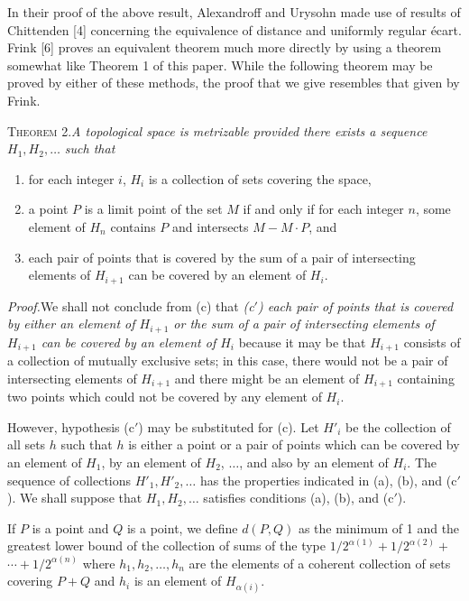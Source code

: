 \documentclass[11pt,a4paper,leqno,twoside]{article}
\newcommand{\thm}[2]{\par\medskip\noindent\textsc{Theorem #1.}\enspace\textit{#2}\par}
\newcommand{\proof}{\par\noindent\textit{Proof.}\enspace}
\begin{document}
In their proof of the above result, Alexandroff and Urysohn made use of results of Chittenden [4] concerning the equivalence of distance and uniformly regular \'ecart. Frink [6] proves an equivalent theorem much more directly by using a theorem somewhat like Theorem 1 of this paper. While the following theorem may be proved by either of these methods, the proof that we give resembles that given by Frink.

\thm{2}{A topological space is metrizable provided there exists a sequence $H_1,H_2,\ldots$ such that}
\begin{enumerate}[label=(\alph*),nosep,leftmargin=2.5em]\itshape
\item for each integer $i$, $H_i$ is a collection of sets covering the space,
\item a point $P$ is a limit point of the set $M$ if and only if for each integer $n$, some element of $H_n$ contains $P$ and intersects $M-M\cdot P$, and
\item each pair of points that is covered by the sum of a pair of intersecting elements of $H_{i+1}$ can be covered by an element of $H_i$.
\end{enumerate}
\proof We shall not conclude from (c) that \textit{(c$'$) each pair of points that is covered by either an element of $H_{i+1}$ or the sum of a pair of intersecting elements of $H_{i+1}$ can be covered by an element of $H_i$} because it may be that $H_{i+1}$ consists of a collection of mutually exclusive sets; in this case, there would not be a pair of intersecting elements of $H_{i+1}$ and there might be an element of $H_{i+1}$ containing two points which could not be covered by any element of $H_i$.

However, hypothesis (c$'$) may be substituted for (c). Let $H'_i$ be the collection of all sets $h$ such that $h$ is either a point or a pair of points which can be covered by an element of $H_1$, by an element of $H_2$, $\ldots$, and also by an element of $H_i$. The sequence of collections $H'_1,H'_2,\ldots$ has the properties indicated in (a), (b), and (c$'$). We shall suppose that $H_1,H_2,\ldots$ satisfies conditions (a), (b), and (c$'$).

If $P$ is a point and $Q$ is a point, we define $d(P,Q)$ as the minimum of 1 and the greatest lower bound of the collection of sums of the type $1/2^{\alpha(1)}+1/2^{\alpha(2)}+$
\newpage
\noindent $\cdots+1/2^{\alpha(n)}$ where $h_1,h_2,\ldots,h_n$ are the elements of a coherent collection of sets covering $P+Q$ and $h_i$ is an element of $H_{\alpha(i)}$.
\end{document}
